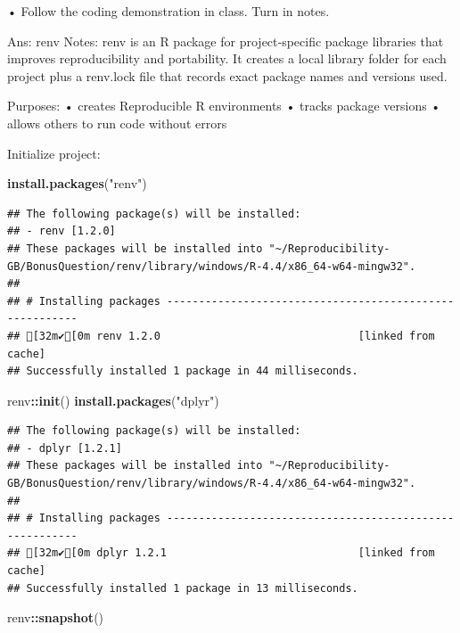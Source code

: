 \documentclass[
]{article}
\newenvironment{Shaded}{\begin{snugshade}}{\end{snugshade}}
\newcommand{\FunctionTok}[1]{\textcolor[rgb]{0.13,0.29,0.53}{\textbf{#1}}}
\newcommand{\NormalTok}[1]{#1}
\newcommand{\SpecialCharTok}[1]{\textcolor[rgb]{0.81,0.36,0.00}{\textbf{#1}}}
\newcommand{\StringTok}[1]{\textcolor[rgb]{0.31,0.60,0.02}{#1}}
\begin{document}
• Follow the coding demonstration in class. Turn in notes.

Ans: renv Notes: renv is an R package for project‑specific package
libraries that improves reproducibility and portability. It creates a
local library folder for each project plus a renv.lock file that records
exact package names and versions used.

Purposes: • creates Reproducible R environments • tracks package
versions • allows others to run code without errors

Initialize project:

\begin{Shaded}
\begin{Highlighting}[]
\FunctionTok{install.packages}\NormalTok{(}\StringTok{"renv"}\NormalTok{)}
\end{Highlighting}
\end{Shaded}

\begin{verbatim}
## The following package(s) will be installed:
## - renv [1.2.0]
## These packages will be installed into "~/Reproducibility-GB/BonusQuestion/renv/library/windows/R-4.4/x86_64-w64-mingw32".
## 
## # Installing packages --------------------------------------------------------
## [32m✔[0m renv 1.2.0                               [linked from cache]
## Successfully installed 1 package in 44 milliseconds.
\end{verbatim}

\begin{Shaded}
\begin{Highlighting}[]
\NormalTok{renv}\SpecialCharTok{::}\FunctionTok{init}\NormalTok{()}
\FunctionTok{install.packages}\NormalTok{(}\StringTok{"dplyr"}\NormalTok{)}
\end{Highlighting}
\end{Shaded}

\begin{verbatim}
## The following package(s) will be installed:
## - dplyr [1.2.1]
## These packages will be installed into "~/Reproducibility-GB/BonusQuestion/renv/library/windows/R-4.4/x86_64-w64-mingw32".
## 
## # Installing packages --------------------------------------------------------
## [32m✔[0m dplyr 1.2.1                              [linked from cache]
## Successfully installed 1 package in 13 milliseconds.
\end{verbatim}

\begin{Shaded}
\begin{Highlighting}[]
\NormalTok{renv}\SpecialCharTok{::}\FunctionTok{snapshot}\NormalTok{()}
\end{Highlighting}
\end{Shaded}
\end{document}
